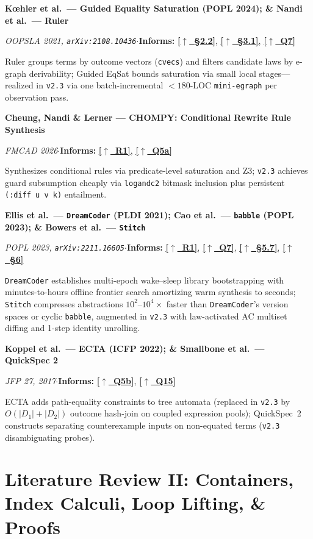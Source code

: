 \documentclass[12pt]{article}
\newcommand{\secback}[2]{\hyperref[#1]{\textcolor{linkblue}{\textbf{\small[\(\uparrow\)~#2]}}}}
\newcommand{\litentry}[4]{%
  \par\medskip\noindent\hypertarget{lit:#1}{}%
  \textbf{#2}\par\nopagebreak\noindent
  {\footnotesize\textit{#3}\quad$\cdot$\quad\textbf{Informs:} #4}\par\nopagebreak\smallskip\noindent\ignorespaces
}
\begin{document}
\litentry{koehler2024}{K\oe hler et al.\ --- Guided Equality Saturation (POPL 2024); \& \hypertarget{lit:nandi2021}{}Nandi et al.\ --- Ruler}{OOPSLA 2021, \texttt{arXiv:2108.10436}}{\secback{sec:audit-bootstrap}{\S2.2}, \secback{sec:v2b-accounting}{\S3.1}, \secback{ans:7}{Q7}}
Ruler groups terms by outcome vectors (\texttt{cvecs}) and filters candidate laws by e-graph derivability; Guided EqSat bounds saturation via small local stages---realized in \texttt{v2.3} via one batch-incremental $<180$-LOC \texttt{mini-egraph} per observation pass.

\litentry{cheung2026}{Cheung, Nandi \& Lerner --- CHOMPY: Conditional Rewrite Rule Synthesis}{FMCAD 2026}{\secback{sec:thesis}{R1}, \secback{ans:5a}{Q5a}}
Synthesizes conditional rules via predicate-level saturation and Z3; \texttt{v2.3} achieves guard subsumption cheaply via \texttt{logandc2} bitmask inclusion plus persistent \texttt{(:diff u v k)} entailment.

\litentry{cao2023}{\hypertarget{lit:ellis2021}{}Ellis et al.\ --- \texttt{DreamCoder} (PLDI 2021); Cao et al.\ --- \texttt{babble} (POPL 2023); \& \hypertarget{lit:bowers2023}{}Bowers et al.\ --- \texttt{Stitch}}{POPL 2023, \texttt{arXiv:2211.16605}}{\secback{sec:thesis}{R1}, \secback{ans:7}{Q7}, \secback{sec:pass2-audit}{\S5.7}, \secback{sec:experiments}{\S6}}
\texttt{DreamCoder} establishes multi-epoch wake--sleep library bootstrapping with minutes-to-hours offline frontier search amortizing warm synthesis to seconds; \texttt{Stitch} compresses abstractions $10^2$--$10^4\times$ faster than \texttt{DreamCoder}'s version spaces or cyclic \texttt{babble}, augmented in \texttt{v2.3} with law-activated AC multiset diffing and 1-step identity unrolling.

\litentry{koppel2022}{Koppel et al.\ --- ECTA (ICFP 2022); \& \hypertarget{lit:smallbone2017}{}Smallbone et al.\ --- QuickSpec 2}{\emph{JFP} 27, 2017}{\secback{ans:5b}{Q5b}, \secback{ans:15}{Q15}}
ECTA adds path-equality constraints to tree automata (replaced in \texttt{v2.3} by $O(|D_1|+|D_2|)$ outcome hash-join on coupled expression pools); QuickSpec~2 constructs separating counterexample inputs on non-equated terms (\texttt{v2.3} disambiguating probes).

\section{Literature Review II: Containers, Index Calculi, Loop Lifting, \& Proofs}
\label{sec:app-b}
\end{document}
